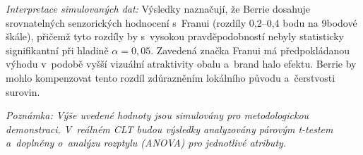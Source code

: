 \textit{Interpretace simulovaných dat:} Výsledky naznačují, že Berrie dosahuje srovnatelných senzorických hodnocení s~Franui (rozdíly 0,2--0,4 bodu na 9bodové škále), přičemž tyto rozdíly by s~vysokou pravděpodobností nebyly statisticky signifikantní při hladině $\alpha = 0{,}05$. Zavedená značka Franui má předpokládanou výhodu v~podobě vyšší vizuální atraktivity obalu a~brand halo efektu. Berrie by mohlo kompenzovat tento rozdíl zdůrazněním lokálního původu a~čerstvosti surovin.

\textit{Poznámka: Výše uvedené hodnoty jsou simulovány pro metodologickou demonstraci. V~reálném CLT budou výsledky analyzovány párovým t-testem a~doplněny o~analýzu rozptylu (ANOVA) pro jednotlivé atributy.}
